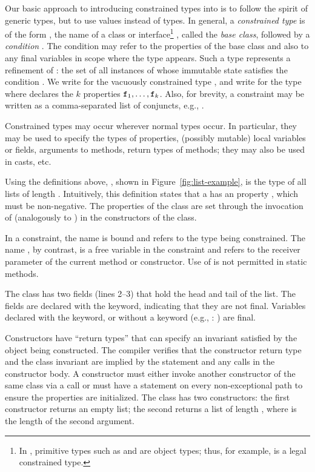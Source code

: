 Our basic approach to introducing constrained types into \Xten{}
is to follow the spirit of generic types, but to use values
instead of types.
%
In general, a {\em constrained type} is of the form ,
the name of a class or interface\footnote{In \Xten{}, primitive
types such as  and  are object types; thus,
for example,  is a legal constrained type.}
, called the {\em base class}, followed
by a {\em condition} .
The condition may refer to the properties of the base class
and also to any final variables in scope where the type appears.
Such a type represents a refinement of : the set of all
instances of  whose immutable state satisfies the
condition .
%
We write  for 
the vacuously constrained type , and
write
 for
the type
where  declares the $k$ properties
${\tt f}_1,\ldots,{\tt f}_k$.  Also, for brevity, a constraint
may be written as a comma-separated list of conjuncts, e.g.,
.

Constrained types may occur wherever normal types occur. In
particular, they may be used to specify the types of properties,
(possibly mutable) local variables or fields,
arguments to methods, return types of methods; they may also be
used in casts, etc.

Using the definitions above, , shown in
Figure~\ref{fig:list-example}, is the type of all lists of
length .
%
Intuitively, this definition states that a  has an 
property , which must be non-negative.
The properties
of the
class are set through the invocation of \tcd{(\ldots)}
(analogously to \tcd{(\ldots)}) in the constructors
of the class.

In a constraint, the name  is bound and refers to the type being
constrained.  The name , by contrast, is a free
variable in the
constraint and refers to the receiver parameter of the current
method or constructor.  Use of  is not permitted in static
methods.

The  class has two
fields (lines 2--3) that hold the head and tail of the list.  The fields are
declared with the  keyword, indicating that they are
not final.  Variables declared with the  keyword, or
without a keyword (e.g., : ) are final.

Constructors have ``return
types'' that can specify an invariant satisfied by the object being
constructed.  The compiler verifies that the
constructor return type and the class invariant are implied by the
 statement and any  calls in the constructor
body.
A constructor must either invoke another constructor of the same
class via a
 call
or must have a  statement on every
non-exceptional path
to ensure the properties are initialized.
The  class has two constructors: the first
constructor returns an empty list;
the second
returns a list of length , where  is the length
of the second argument. 

